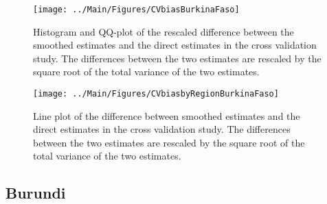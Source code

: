 \documentclass[12pt]{article}\usepackage[]{graphicx}\usepackage[]{color}
\newenvironment{knitrout}{}{} %
\begin{document}
\begin{knitrout}
\color{fgcolor}\begin{figure}[bht]

{\centering \texttt{[image: ../Main/Figures/CVbiasBurkinaFaso]} 

}

\caption[Histogram and QQ-plot of the rescaled difference between the smoothed estimates and the direct estimates in the cross validation study]{Histogram and QQ-plot of the rescaled difference between the smoothed estimates and the direct estimates in the cross validation study. The differences between the two estimates are rescaled by the square root of the total variance of the two estimates.}\label{fig:unnamed-chunk-29}
\end{figure}


\end{knitrout}

\begin{knitrout}
\color{fgcolor}\begin{figure}[bht]

{\centering \texttt{[image: ../Main/Figures/CVbiasbyRegionBurkinaFaso]} 

}

\caption[Line plot of the difference between smoothed estimates and the direct estimates in the cross validation study]{Line plot of the difference between smoothed estimates and the direct estimates in the cross validation study. The differences between the two estimates are rescaled by the square root of the total variance of the two estimates.}\label{fig:unnamed-chunk-30}
\end{figure}


\end{knitrout}

\clearpage
\subsection{Burundi}


\end{document}
